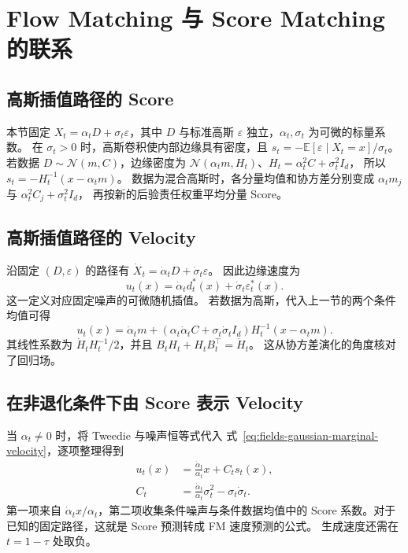 \section{Flow Matching 与 Score Matching 的联系}
\label{sec:fields-fm-score}

\subsection{高斯插值路径的 Score}

本节固定 \(X_t=\alpha_tD+\sigma_t\varepsilon\)，其中 \(D\) 与标准高斯
\(\varepsilon\) 独立，\(\alpha_t,\sigma_t\) 为可微的标量系数。
在 \(\sigma_t>0\) 时，高斯卷积使内部边缘具有密度，且
\(s_t=-\mathbb E[\varepsilon\mid X_t=x]/\sigma_t\)。
若数据 \(D\sim\mathcal N(m,C)\)，边缘密度为
\(\mathcal N(\alpha_tm,H_t)\)、\(H_t=\alpha_t^2C+\sigma_t^2I_d\)，
所以 \(s_t=-H_t^{-1}(x-\alpha_tm)\)。
数据为混合高斯时，各分量均值和协方差分别变成
\(\alpha_tm_j\) 与 \(\alpha_t^2C_j+\sigma_t^2I_d\)，
再按新的后验责任权重平均分量 Score。

\subsection{高斯插值路径的 Velocity}

沿固定 \((D,\varepsilon)\) 的路径有
\(\dot X_t=\dot\alpha_tD+\dot\sigma_t\varepsilon\)。
因此边缘速度为
\begin{equation}
 u_t(x)=\dot\alpha_t d_t^*(x)+\dot\sigma_t\varepsilon_t^*(x).
 \label{eq:fields-gaussian-marginal-velocity}
\end{equation}
这一定义对应固定噪声的可微随机插值。
若数据为高斯，代入上一节的两个条件均值可得
\[
 u_t(x)=\dot\alpha_tm+
   (\alpha_t\dot\alpha_t C+\sigma_t\dot\sigma_tI_d)
                        H_t^{-1}(x-\alpha_tm).
\]
其线性系数为 \(\dot H_t H_t^{-1}/2\)，并且
\(B_tH_t+H_tB_t^\top=\dot H_t\)。
这从协方差演化的角度核对了回归场。

\subsection{在非退化条件下由 Score 表示 Velocity\requiredderivation}

当 \(\alpha_t\ne0\) 时，将 Tweedie 与噪声恒等式代入
式~\eqref{eq:fields-gaussian-marginal-velocity}，逐项整理得到
\begin{equation}
 \begin{aligned}
 u_t(x)&=\frac{\dot\alpha_t}{\alpha_t}x+C_t s_t(x),\\
 C_t&=\frac{\dot\alpha_t}{\alpha_t}\sigma_t^2
                                     -\sigma_t\dot\sigma_t.
 \end{aligned}
 \label{eq:fields-score-to-velocity}
\end{equation}
第一项来自 \(\dot\alpha_tx/\alpha_t\)，第二项收集条件噪声与条件数据均值中的
Score 系数。对于已知的固定路径，这就是 Score 预测转成 FM 速度预测的公式。
生成速度还需在 \(t=1-\tau\) 处取负。

